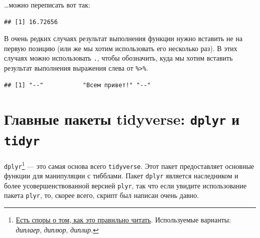 \documentclass[]{book}
\newenvironment{Shaded}{\begin{snugshade}}{\end{snugshade}}
\newcommand{\KeywordTok}[1]{\textcolor[rgb]{0.13,0.29,0.53}{\textbf{#1}}}
\newcommand{\DecValTok}[1]{\textcolor[rgb]{0.00,0.00,0.81}{#1}}
\newcommand{\StringTok}[1]{\textcolor[rgb]{0.31,0.60,0.02}{#1}}
\newcommand{\OperatorTok}[1]{\textcolor[rgb]{0.81,0.36,0.00}{\textbf{#1}}}
\newcommand{\NormalTok}[1]{#1}
\begin{document}
\ldots{}можно переписать вот так:

\begin{Shaded}
\end{Shaded}

\begin{verbatim}
## [1] 16.72656
\end{verbatim}

В очень редких случаях результат выполнения функции нужно вставить не на
первую позицию (или же мы хотим использовать его несколько раз). В этих
случаях можно использовать \texttt{.}, чтобы обозначить, куда мы хотим
вставить результат выполнения выражения слева от
\texttt{\%\textgreater{}\%}.

\begin{Shaded}
\end{Shaded}

\begin{verbatim}
## [1] "--"           "Всем привет!" "--"
\end{verbatim}

\section{\texorpdfstring{Главные пакеты tidyverse: \texttt{dplyr} и
\texttt{tidyr}}{Главные пакеты tidyverse: dplyr и tidyr}}\label{ux433ux43bux430ux432ux43dux44bux435-ux43fux430ux43aux435ux442ux44b-tidyverse-dplyr-ux438-tidyr}

\texttt{dplyr}\footnote{\href{https://community.rstudio.com/t/pronunciations-of-common-r-terms/1810}{Есть
  споры о том, как это правильно читать}. Используемые варианты:
  \emph{диплаер}, \emph{диплюр}, \emph{диплир}.} --- это самая основа
всего \texttt{tidyverse}. Этот пакет предоставляет основные функции для
манипуляции с тибблами. Пакет \texttt{dplyr} является наследником и
более усовершенствованной версией \texttt{plyr}, так что если увидите
использование пакета \texttt{plyr}, то, скорее всего, скрипт был написан
очень давно.
\end{document}
